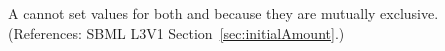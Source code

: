 A \Species cannot set values for both  and
 because they are mutually exclusive.  (References:
SBML L3V1 Section~\ref{sec:initialAmount}.)
